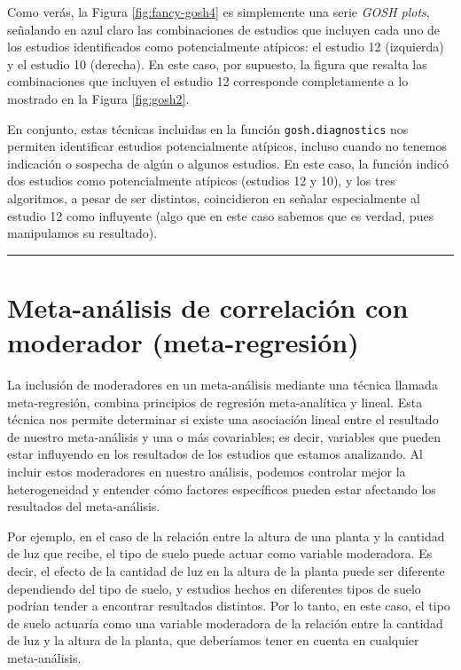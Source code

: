 \documentclass[
  bookmarksnumbered]{article}
\begin{document}
Como verás, la Figura \ref{fig:fancy-gosh4} es simplemente una serie \emph{GOSH plots}, señalando en azul claro las combinaciones de estudios que incluyen cada uno de los estudios identificados como potencialmente atípicos: el estudio 12 (izquierda) y el estudio 10 (derecha). En este caso, por supuesto, la figura que resalta las combinaciones que incluyen el estudio 12 corresponde completamente a lo mostrado en la Figura \ref{fig:gosh2}.

En conjunto, estas técnicas incluidas en la función \texttt{gosh.diagnostics} nos permiten identificar estudios potencialmente atípicos, incluso cuando no tenemos indicación o sospecha de algún o algunos estudios. En este caso, la función indicó dos estudios como potencialmente atípicos (estudios 12 y 10), y los tres algoritmos, a pesar de ser distintos, coincidieron en señalar especialmente al estudio 12 como influyente (algo que en este caso sabemos que es verdad, pues manipulamos su resultado).

\begin{center}\rule{0.5\linewidth}{0.5pt}\end{center}

\hypertarget{met-moderation}{%
\section{Meta-análisis de correlación con moderador (meta-regresión)}\label{met-moderation}}

La inclusión de moderadores en un meta-análisis mediante una técnica llamada meta-regresión, combina principios de regresión meta-analítica y lineal. Esta técnica nos permite determinar si existe una asociación lineal entre el resultado de nuestro meta-análisis y una o más covariables; es decir, variables que pueden estar influyendo en los resultados de los estudios que estamos analizando. Al incluir estos moderadores en nuestro análisis, podemos controlar mejor la heterogeneidad y entender cómo factores específicos pueden estar afectando los resultados del meta-análisis.

Por ejemplo, en el caso de la relación entre la altura de una planta y la cantidad de luz que recibe, el tipo de suelo puede actuar como variable moderadora. Es decir, el efecto de la cantidad de luz en la altura de la planta puede ser diferente dependiendo del tipo de suelo, y estudios hechos en diferentes tipos de suelo podrían tender a encontrar resultados distintos. Por lo tanto, en este caso, el tipo de suelo actuaría como una variable moderadora de la relación entre la cantidad de luz y la altura de la planta, que deberíamos tener en cuenta en cualquier meta-análisis.
\end{document}
